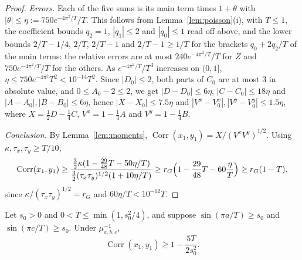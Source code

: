 \begin{proof}
\emph{Errors.} Each of the five sums is its main term times $1+\theta$ with
$|\theta|\le\eta:=750e^{-4\pi^2/T}/T$. This follows from
Lemma~\ref{lem:poisson}(i), with $T\le1$, the coefficient bounds $q_2=1$,
$|q_1|\le2$ and $|q_0|\le1$ read off above, and the lower bounds $2/T-1/4$,
$2/T$, $2/T-1$ and $2/T-1\ge1/T$ for the brackets $q_0+2q_2/T$ of the main
terms: the relative errors are at most $240e^{-4\pi^2/T}/T$ for $Z$ and $750
e^{-4\pi^2/T}/T$ for the others. As $e^{-4\pi^2/T}/T^3$ increases on $(0,1]$,
$\eta\le750e^{-4\pi^2}T^2<10^{-14}T^2$. Since $|D_0|\le2$, both parts of $C_0$
are at most $3$ in absolute value, and $0\le A_0-2\le2$, we get $|D-D_0|\le6
\eta$, $|C-C_0|\le18\eta$ and $|A-A_0|,|B-B_0|\le6\eta$, hence $|X-X_0|\le7.5
\eta$ and $|V^x-V^x_0|,|V^y-V^y_0|\le1.5\eta$, where $X=\frac12D-\frac14C$,
$V^x=1-\frac14A$ and $V^y=1-\frac14B$.

\emph{Conclusion.} By Lemma~\ref{lem:moments}, $\operatorname{Corr}(x_1,y_1)=X/
(V^xV^y)^{1/2}$. Using $\kappa,\tau_x,\tau_y\ge T/10$,
\[
\operatorname{Corr}(x_1,y_1)\ge\frac{\frac32\kappa(1-\frac{29}{48}T-50\eta/T)}
{\frac32(\tau_x\tau_y)^{1/2}(1+10\eta/T)}\ge r_G\Bigl(1-\frac{29}{48}T-60\frac
\eta T\Bigr)\ge r_G(1-T),
\]
since $\kappa/(\tau_x\tau_y)^{1/2}=r_G$ and $60\eta/T<10^{-12}T$.
\end{proof}

\begin{lemma}\label{lem:bridgem1}
Let $s_0>0$ and $0<T\le\min(1,s_0^2/4)$, and suppose $\sin(\pi a/T)\ge s_0$ and
$\sin(\pi c/T)\ge s_0$. Under $\mu^{-1}_{a,b,c}$,
\[
\operatorname{Corr}(x_1,y_1)\ge1-\frac{5T}{2s_0^2}.
\]
\end{lemma}

